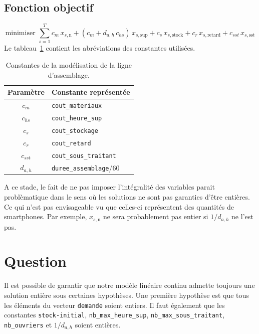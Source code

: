 \documentclass[12pt,oneside,a4paper]{article}
\newcommand{\question}
{
\addtocounter{section}{1}
\section*{Question \thesection}
}
\newcommand{\myX}[2]{x_{#1,\text{#2}}}
\newcommand{\xSemaine}[1]{\myX{s}{#1}}
\newcommand{\xn}{\xSemaine{n}}
\newcommand{\xsup}{\xSemaine{sup}}
\newcommand{\xstock}{\xSemaine{stock}}
\newcommand{\xretard}{\xSemaine{retard}}
\newcommand{\xsst}{\xSemaine{sst}}
\begin{document}
\subsection*{Fonction objectif}
\[
  \mbox{minimiser } 
  \sum_{s=1}^{T} 
  c_m\, \xn + (c_m + d_{a,h} \, c_{hs})\, \xsup
  + c_s\, \xstock + c_r\, \xretard + c_{sst}\, \xsst
\]
Le tableau~\ref{tab:constantesQuestion1} contient les abréviations
des constantes utilisées.
\begin{table}[h]
  \begin{center}
  \begin{tabular}{|c|l|}
    \hline
    Paramètre & Constante représentée \\
    \hline
    \hline
    $c_m$ & \texttt{cout\_materiaux} \\
    \hline
    $c_{hs}$ & \texttt{cout\_heure\_sup} \\
    \hline
    $c_s$ & \texttt{cout\_stockage} \\
    \hline
    $c_r$ & \texttt{cout\_retard} \\
    \hline
    $c_{sst}$ & \texttt{cout\_sous\_traitant} \\
    \hline
    $d_{a,h}$ & \texttt{duree\_assemblage}/60 \\
    \hline
  \end{tabular}
  \caption{Constantes de la modélisation de la ligne d'assemblage.}
  \label{tab:constantesQuestion1}
  \end{center}
\end{table}

A ce stade, le fait de ne pas imposer l'intégralité des variables
parait problèmatique dans le sens où les solutions ne sont pas 
garanties d'être entières. Ce qui n'est pas envisageable 
vu que celles-ci représentent des quantités de smartphones.
Par exemple, 
$\xn$ ne sera probablement pas entier si $1/d_{a,h}$ ne l'est pas.

\question %

Il est possible de garantir que notre modèle linéaire continu
admette toujours une solution entière sous certaines hypothèses.
Une première hypothèse est que tous les éléments du 
vecteur \texttt{demande} soient entiers.
Il faut également que les constantes \texttt{stock-initial},
\texttt{nb\_max\_heure\_sup}, \texttt{nb\_max\_sous\_traitant},
\texttt{nb\_ouvriers} et $1/d_{a,h}$ soient entières.
\end{document}
